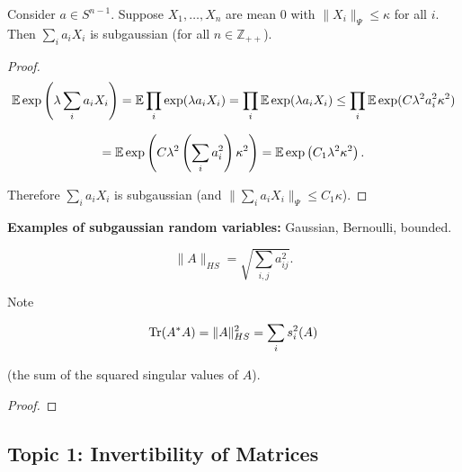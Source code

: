 \begin{proposition}
Consider \(a \in S^{n-1}\). Suppose \(X_1, \ldots, X_n\) are mean 0 with \(\lVert X_i \rVert_{\Psi} \leq \kappa\) for all \(i\). Then \(\sum_{i} a_i X_i\) is subgaussian (for all \(n \in \mathbb{Z}_{++}\)).

\end{proposition}

\begin{proof}

\[
\mathbb{E} \exp \left ( \lambda \sum_i a_i X_i \right) = \mathbb{E} \prod_i \exp(\lambda a_i X_i) = \prod_i \mathbb{E} \exp(\lambda a_i X_i) \leq \prod_i \mathbb{E} \exp(C \lambda^2 a_i^2 \kappa^2) 
\]

\[
= \mathbb{E} \exp \left(C \lambda^2 \left( \sum_i a_i^2 \right) \kappa^2 \right )  = \mathbb{E} \exp \left(C_1 \lambda^2 \kappa^2 \right ) .
\]

Therefore \(\sum_{i} a_i X_i\) is subgaussian (and \( \lVert \sum_i a_i X_i \rVert_\Psi \leq C_1 \kappa\)).

\end{proof}

\textbf{Examples of subgaussian random variables:} Gaussian, Bernoulli, bounded. 

\begin{definition}

\[
\lVert A \rVert_{HS} = \sqrt{\sum_{i,j} a_{ij}^2}.
\]

\end{definition}

\begin{remark}

Note 

\[
\operatorname{Tr}(A^*A) = \lVert A \rVert_{HS}^2 = \sum_i s_i^2(A)
\]

(the sum of the squared singular values of \(A\)).

\end{remark}

\begin{proposition}

\end{proposition}

\begin{proof}

\end{proof}

\subsection{Topic 1: Invertibility of Matrices}

